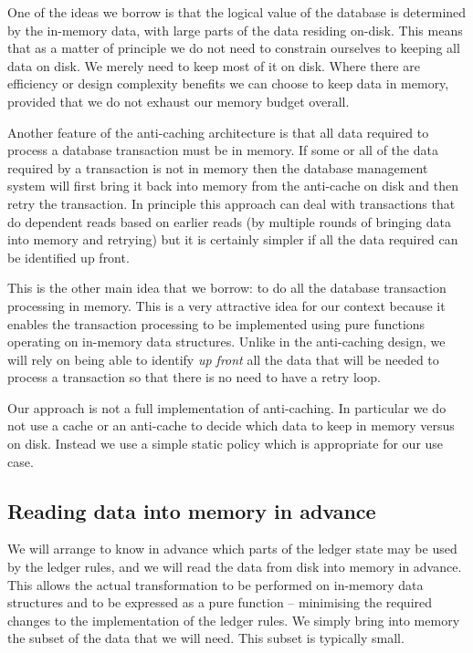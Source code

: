 \documentclass[11pt,a4paper]{article}
\begin{document}
One of the ideas we borrow is that the logical value of the database is
determined by the in-memory data, with large parts of the data residing on-disk.
This means that as a matter of principle we do not need to constrain ourselves
to keeping all data on disk. We merely need to keep most of it on disk. Where
there are efficiency or design complexity benefits we can choose to keep data
in memory, provided that we do not exhaust our memory budget overall.

Another feature of the anti-caching architecture is that all data required to
process a database transaction must be in memory. If some or all of the data
required by a transaction is not in memory then the database management system
will first bring it back into memory from the anti-cache on disk and then retry
the transaction. In principle this approach can deal with transactions that do
dependent reads based on earlier reads (by multiple rounds of bringing data
into memory and retrying) but it is certainly simpler if all the data required
can be identified up front.

This is the other main idea that we borrow: to do all the database transaction
processing in memory. This is a very attractive idea for our context because it
enables the transaction processing to be implemented using pure functions
operating on in-memory data structures. Unlike in the anti-caching design, we
will rely on being able to identify \emph{up front} all the data that will be
needed to process a transaction so that there is no need to have a retry loop.

Our approach is not a full implementation of anti-caching. In particular we
do not use a cache or an anti-cache to decide which data to keep in memory
versus on disk. Instead we use a simple static policy which is appropriate for
our use case.

\subsection{Reading data into memory in advance}
\label{reading-data-into-memory-in-advance}

We will arrange to know in advance which parts of the ledger state may be used
by the ledger rules, and we will read the data from disk into memory in advance.
This allows the actual transformation to be performed on in-memory data
structures and to be expressed as a pure function -- minimising the required
changes to the implementation of the ledger rules. We simply bring into memory
the subset of the data that we will need. This subset is typically small.
\end{document}
